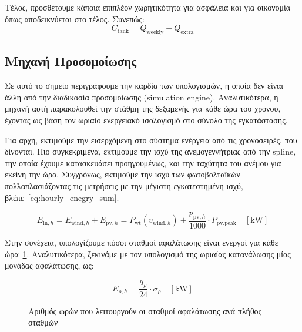 Τέλος, προσθέτουμε κάποια επιπλέον χωρητικότητα για ασφάλεια και για οικονομία
όπως αποδεικνύεται στο τέλος. Συνεπώς:
\begin{equation}\label{eq:tank_capacity}
	C_{\text{tank}} = Q_{\text{weekly}} + Q_{\text{extra}}
\end{equation}

\subsection{Μηχανή Προσομοίωσης}
Σε αυτό το σημείο περιγράφουμε την καρδία των υπολογισμών, η οποία δεν είναι
άλλη από την διαδικασία προσομοίωσης (simulation engine). Αναλυτικότερα, η
μηχανή αυτή παρακολουθεί την στάθμη της δεξαμενής για κάθε ώρα του χρόνου,
έχοντας ως βάση τον ωριαίο ενεργειακό ισολογισμό στο σύνολο της εγκατάστασης.

Για αρχή, εκτιμούμε την εισερχόμενη στο σύστημα ενέργεια από τις χρονοσειρές,
που δίνονται. Πιο συγκεκριμένα, εκτιμούμε την ισχύ της ανεμογεννήτριας από την
spline, την οποία έχουμε κατασκευάσει προηγουμένως, και την ταχύτητα του ανέμου
για εκείνη την ώρα. Συγχρόνως, εκτιμούμε την ισχύ των φωτοβολταϊκών
πολλαπλασιάζοντας τις μετρήσεις με την μέγιστη εγκατεστημένη ισχύ, βλέπε~\eqref{eq:hourly_enegry_sum}.

\begin{equation}\label{eq:hourly_enegry_sum}
	E_{\text{in},h} = E_{\text{wind},h} + E_{\text{pv},h}= P_{\text{wt}} \left(v_{\text{wind},h}\right) + \frac{p_{\text{pv},h}}{1000}\cdot P_{\text{pv,peak}}\quad \left[\si{\kilo\watt}\right]
\end{equation}

Στην συνέχεια, υπολογίζουμε πόσοι σταθμοί αφαλάτωσης είναι ενεργοί για κάθε
ώρα~\ref{fig:working_hours_per_des}. Αναλυτικότερα, ξεκινάμε με τον υπολογισμό της ωριαίας κατανάλωσης μίας
μονάδας αφαλάτωσης, ως:

\begin{equation}\label{eq:hourly_desalination_consumption}
	E_{\rho ,h}= \frac{q_{\rho}}{24}\cdot \sigma_{\rho}\quad \left[\si{\kilo\watt}\right]
\end{equation}

\begin{figure}
	\centering
	\caption{Αριθμός ωρών που λειτουργούν οι σταθμοί αφαλάτωσης ανά πλήθος σταθμών}\label{fig:working_hours_per_des}
\end{figure}

